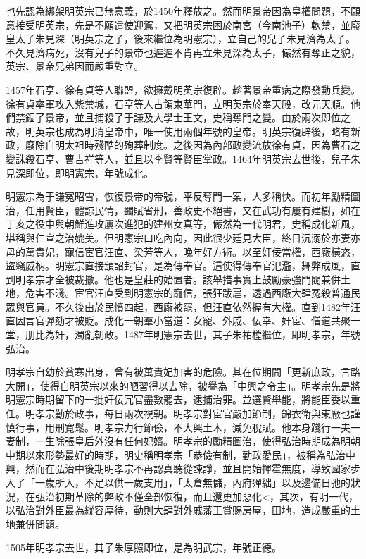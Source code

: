 也先認為綁架明英宗已無意義，於1450年釋放之。然而明景帝因為皇權問題，不願意接受明英宗，先是不願遣使迎駕，又把明英宗困於南宮（今南池子）軟禁，並廢皇太子朱見深（明英宗之子，後來繼位為明憲宗），立自己的兒子朱見濟為太子。不久見濟病死，沒有兒子的景帝也遲遲不肯再立朱見深為太子，儼然有奪正之貌，英宗、景帝兄弟因而嚴重對立。

1457年石亨、徐有貞等人聯盟，欲擁戴明英宗復辟。趁著景帝重病之際發動兵變。徐有貞率軍攻入紫禁城，石亨等人占領東華門，立明英宗於奉天殿，改元天順。他們禁錮了景帝，並且捕殺了于謙及大學士王文，史稱奪門之變。由於兩次即位之故，明英宗也成為明清皇帝中，唯一使用兩個年號的皇帝。明英宗復辟後，略有新政，廢除自明太祖時殘酷的殉葬制度。之後因為內部政變流放徐有貞，因為曹石之變誅殺石亨、曹吉祥等人，並且以李賢等賢臣掌政。1464年明英宗去世後，兒子朱見深即位，即明憲宗，年號成化。

明憲宗為于謙冤昭雪，恢復景帝的帝號，平反奪門一案，人多稱快。而初年勵精圖治，任用賢臣，體諒民情，蠲賦省刑，善政史不絕書，又在武功有屢有建樹，如在丁亥之役中與朝鮮進攻屢次進犯的建州女真等，儼然為一代明君，史稱成化新風，堪稱與仁宣之治媲美。但明憲宗口吃內向，因此很少廷見大臣，終日沉溺於亦妻亦母的萬貴妃，寵信宦官汪直、梁芳等人，晚年好方術。以至奸佞當權，西廠橫恣，盜竊威柄。明憲宗直接頒詔封官，是為傳奉官。這使得傳奉官氾濫，舞弊成風，直到明孝宗才全被裁撤。他也是皇莊的始置者。該舉措事實上鼓勵豪強門閥兼併土地，危害不淺。宦官汪直受到明憲宗的寵信，張狂跋扈，透過西廠大肆冤殺普通民眾與官員。不久後由於民憤四起，西廠被罷，但汪直依然握有大權。直到1482年汪直因言官彈劾才被貶。成化一朝羣小當道：女寵、外戚、佞幸、奸宦、僧道共聚一堂，朋比為奸，濁亂朝政。1487年明憲宗去世，其子朱祐樘繼位，即明孝宗，年號弘治。

明孝宗自幼於貧寒出身，曾有被萬貴妃加害的危險。其在位期間「更新庶政，言路大開」，使得自明英宗以來的陋習得以去除，被譽為「中興之令主」。明孝宗先是將明憲宗時期留下的一批奸佞冗官盡數罷去，逮捕治罪。並選賢舉能，將能臣委以重任。明孝宗勤於政事，每日兩次視朝。明孝宗對宦官嚴加節制，錦衣衛與東廠也謹慎行事，用刑寬鬆。明孝宗力行節儉，不大興土木，減免稅賦。他本身踐行一夫一妻制，一生除張皇后外沒有任何妃嬪。明孝宗的勵精圖治，使得弘治時期成為明朝中期以來形勢最好的時期，明史稱明孝宗「恭儉有制，勤政愛民」，被稱為弘治中興，然而在弘治中後期明孝宗不再認真聽從諫諍，並且開始揮霍無度，導致國家步入了「一歲所入，不足以供一歲支用」，「太倉無儲，內府殫絀」以及邊備日弛的狀況，在弘治初期革除的弊政不僅全部恢復，而且還更加惡化<，其次，有明一代，以弘治對外臣最為縱容厚待，動則大肆對外戚藩王賞賜房屋，田地，造成嚴重的土地兼併問題。

1505年明孝宗去世，其子朱厚照即位，是為明武宗，年號正德。

